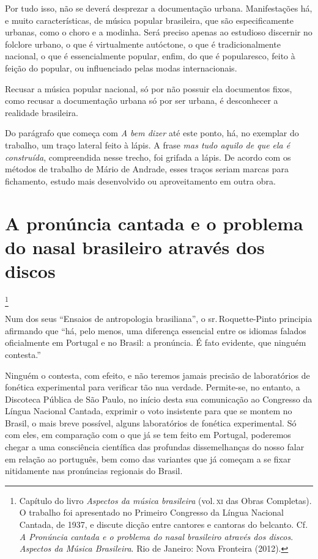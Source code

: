 Por tudo isso, não se deverá desprezar a documentação urbana.
Manifestações há, e muito características, de música popular brasileira,
que são especificamente urbanas, como o choro e a modinha. Será preciso
apenas ao estudioso discernir no folclore urbano, o que é virtualmente
autóctone, o que é tradicionalmente nacional, o que é essencialmente
popular, enfim, do que é popularesco, feito à feição do popular, ou
influenciado pelas modas internacionais.

Recusar a música popular nacional, só por não possuir ela documentos
fixos, como recusar a documentação urbana só por ser urbana, é
desconhecer a realidade brasileira.

Do parágrafo que começa com \textit{A bem dizer} até este ponto, há, no
exemplar do trabalho, um traço lateral feito à lápis. A frase \textit{mas tudo
aquilo de que ela é construída}, compreendida nesse trecho, foi grifada
a lápis. De acordo com os métodos de trabalho de Mário de Andrade, esses
traços seriam marcas para fichamento, estudo mais desenvolvido ou
aproveitamento em outra obra.

\chapter{A pronúncia cantada e o problema do nasal brasileiro através dos discos}\footnote{Capítulo do livro \textit{Aspectos da música brasileira} (vol.\,\textsc{xi} das Obras Completas). O trabalho foi apresentado no Primeiro Congresso da Língua Nacional Cantada, de 1937, e discute dicção entre cantores e cantoras do belcanto. Cf. \textit{A Pronúncia cantada e o problema do nasal brasileiro através dos discos}. \textit{Aspectos da Música Brasileira}. Rio de Janeiro: Nova Fronteira (2012).}

Num dos seus ``Ensaios de antropologia brasiliana'', o sr.\,Roquette-Pinto
principia afirmando que ``há, pelo menos, uma diferença essencial entre
os idiomas falados oficialmente em Portugal e no Brasil: a pronúncia. É
fato evidente, que ninguém contesta.''

Ninguém o contesta, com efeito, e não teremos jamais precisão de
laboratórios de fonética experimental para verificar tão nua verdade.
Permite-se, no entanto, a Discoteca Pública de São Paulo, no início
desta sua comunicação ao Congresso da Língua Nacional Cantada, exprimir
o voto insistente para que se montem no Brasil, o mais breve possível,
alguns laboratórios de fonética experimental. Só com eles, em comparação
com o que já se tem feito em Portugal, poderemos chegar a uma
consciência científica das profundas dissemelhanças do nosso falar em
relação ao português, bem como das variantes que já começam a se fixar
nitidamente nas pronúncias regionais do Brasil.

